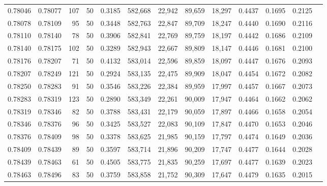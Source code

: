 \begin{tabular}{rrrrrrrrrrrrr}
0.78046 & 0.78077 &   107 &  50 &                                     0.3185 & 582,668 &  22,942 &  89,659 &  18,297 & 0.4437 & 0.1695 & 0.2125 \\
0.78078 & 0.78109 &    95 &  50 &                                     0.3448 & 582,763 &  22,847 &  89,709 &  18,247 & 0.4440 & 0.1690 & 0.2116 \\
0.78110 & 0.78140 &    78 &  50 &                                     0.3906 & 582,841 &  22,769 &  89,759 &  18,197 & 0.4442 & 0.1686 & 0.2109 \\
0.78140 & 0.78175 &   102 &  50 &                                     0.3289 & 582,943 &  22,667 &  89,809 &  18,147 & 0.4446 & 0.1681 & 0.2100 \\
0.78176 & 0.78207 &    71 &  50 &                                     0.4132 & 583,014 &  22,596 &  89,859 &  18,097 & 0.4447 & 0.1676 & 0.2093 \\
0.78207 & 0.78249 &   121 &  50 &                                     0.2924 & 583,135 &  22,475 &  89,909 &  18,047 & 0.4454 & 0.1672 & 0.2082 \\
0.78250 & 0.78283 &    91 &  50 &                                     0.3546 & 583,226 &  22,384 &  89,959 &  17,997 & 0.4457 & 0.1667 & 0.2073 \\
0.78283 & 0.78319 &   123 &  50 &                                     0.2890 & 583,349 &  22,261 &  90,009 &  17,947 & 0.4464 & 0.1662 & 0.2062 \\
0.78319 & 0.78346 &    82 &  50 &                                     0.3788 & 583,431 &  22,179 &  90,059 &  17,897 & 0.4466 & 0.1658 & 0.2054 \\
0.78346 & 0.78376 &    96 &  50 &                                     0.3425 & 583,527 &  22,083 &  90,109 &  17,847 & 0.4470 & 0.1653 & 0.2046 \\
0.78376 & 0.78409 &    98 &  50 &                                     0.3378 & 583,625 &  21,985 &  90,159 &  17,797 & 0.4474 & 0.1649 & 0.2036 \\
0.78409 & 0.78439 &    89 &  50 &                                     0.3597 & 583,714 &  21,896 &  90,209 &  17,747 & 0.4477 & 0.1644 & 0.2028 \\
0.78439 & 0.78463 &    61 &  50 &                                     0.4505 & 583,775 &  21,835 &  90,259 &  17,697 & 0.4477 & 0.1639 & 0.2023 \\
0.78463 & 0.78496 &    83 &  50 &                                     0.3759 & 583,858 &  21,752 &  90,309 &  17,647 & 0.4479 & 0.1635 & 0.2015 \\

\end{tabular}
